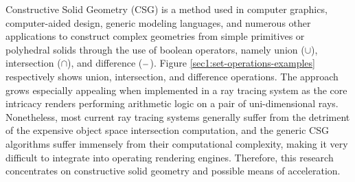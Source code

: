 \documentclass[a4paper,11pt,oneside]{article}
\newcommand{\minus}{\scalebox{0.9}[1.0]{$-$}} %
\begin{document}
Constructive Solid Geometry (CSG) is a method used in computer graphics, computer-aided design, generic modeling languages, and numerous other applications to construct complex geometries from simple primitives or polyhedral solids through the use of boolean operators, namely union ($\cup$),  intersection ($\cap$), and difference ($\minus$). Figure \ref{sec1:set-operations-examples} respectively shows union, intersection, and difference operations. The approach grows especially appealing when implemented in a ray tracing system as the core intricacy renders performing arithmetic logic on a pair of uni-dimensional rays. Nonetheless, most current ray tracing systems generally suffer from the detriment of the expensive object space intersection computation, and the generic CSG algorithms suffer immensely from their computational complexity, making it very difficult to integrate into operating rendering engines. Therefore, this research concentrates on constructive solid geometry and possible means of acceleration.
  
\end{document}
